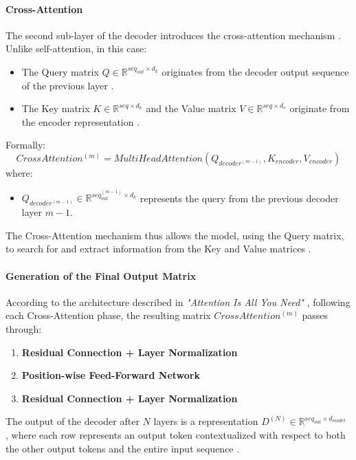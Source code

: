 \paragraph{Cross-Attention} The second sub-layer of the decoder introduces the cross-attention mechanism \cite{arxiv-attention}. Unlike self-attention, in this case:
\begin{itemize}
\item The Query matrix $Q \in \mathbb{R}^{seq_{out} \times d_k}$ originates from the decoder output sequence of the previous layer \cite{arxiv-attention, hashnode}.
\item The Key matrix $K\in \mathbb{R}^{seq \times d_k}$ and the Value matrix $V \in \mathbb{R}^{seq \times d_v}$ originate from the encoder representation \cite{arxiv-attention, stanford}.
\end{itemize}
Formally:
$$
CrossAttention^{(m)} = MultiHeadAttention(Q_{decoder^{(m-1)}}, K_{encoder}, V_{encoder})
$$
where:
\begin{itemize}
\item $Q_{decoder^{(m-1)}} \in \mathbb{R}^{seq_{out}^{(m-1)} \times d_k}$ represents the query from the previous decoder layer $m-1$.
\end{itemize}
The Cross-Attention mechanism thus allows the model, using the Query matrix, to search for and extract information from the Key and Value matrices \cite{hashnode, stanford}.

\paragraph{Generation of the Final Output Matrix}
According to the architecture described in \textit{"Attention Is All You Need"} \cite{arxiv-attention}, following each Cross-Attention phase, the resulting matrix $CrossAttention^{(m)}$ passes through:
\begin{enumerate}
\item \textbf{Residual Connection + Layer Normalization} \cite{arxiv-attention, arxiv-skipconnection-survey}
\item \textbf{Position-wise Feed-Forward Network} \cite{arxiv-attention, attention-is-not}
\item \textbf{Residual Connection + Layer Normalization} \cite{arxiv-attention, git-hub}
\end{enumerate}
The output of the decoder after $N$ layers is a representation $D^{(N)}\in \mathbb{R}^{seq_{out} \times d_{model}}$ \cite{arxiv-attention}, where each row represents an output token contextualized with respect to both the other output tokens and the entire input sequence \cite{stanford, hashnode}.

